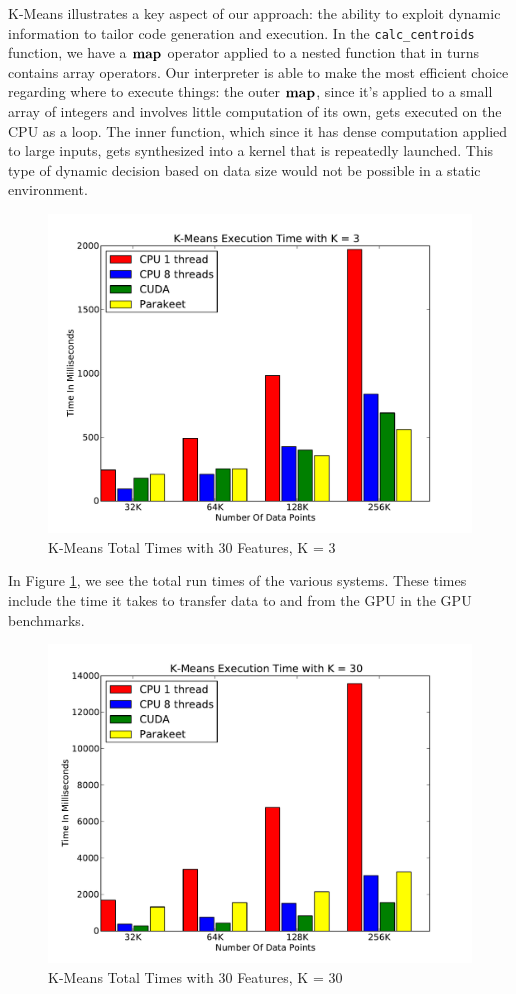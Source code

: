 \documentclass[preprint]{sigplanconf}
\begin{document}
K-Means illustrates a key aspect of our approach: the ability to exploit dynamic information to tailor code generation and execution.  In the \texttt{calc\_centroids} function, we have a $\mbox{\textbf{map}}$ operator applied to a
nested function that in turns contains array operators.  Our interpreter is able to make the most efficient choice regarding where to execute things: the outer $\mbox{\textbf{map}}$, since it's applied to a small array of integers and involves little computation of its own, gets executed on the CPU as a loop.  The inner function, which since it has dense computation applied to large inputs, gets synthesized into a kernel that is repeatedly launched.  This type of dynamic decision based on data size would not be possible in a static environment.

\begin{figure}
\includegraphics[scale=0.45]{KMCPUK3.pdf}
\caption{K-Means Total Times with 30 Features, K = 3}
\label{KMCPU3}
\end{figure}

In Figure \ref{KMCPU3}, we see the total run times of the various systems. These times include the time it takes to transfer data to and from the GPU in the GPU benchmarks.

\begin{figure}
\includegraphics[scale=0.45]{KMCPUK30.pdf}
\caption{K-Means Total Times with 30 Features, K = 30}
\label{KMCPU30}
\end{figure}
\end{document}
